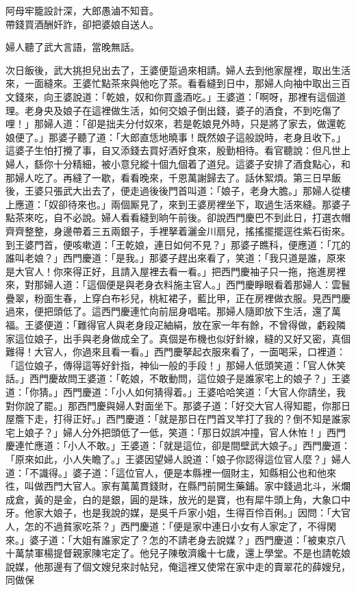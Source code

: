 \begin{myquote} 
阿母牢籠設計深，大郎愚滷不知音。\\帶錢買酒酬奸詐，卻把婆娘自送人。{}
\end{myquote} 

婦人聽了武大言語，當晚無話。

次日飯後，武大挑担兒出去了，王婆便踅過來相請。婦人去到他家屋裡，取出生活來，一面縫來。王婆忙點茶來與他吃了茶。看看縫到日中，那婦人向袖中取出三百文錢來，向王婆說道：「乾娘，奴和你買盞酒吃。」王婆道：「啊呀，那裡有這個道理。老身央及娘子在這裡做生活，如何交娘子倒出錢，婆子的酒食，不到吃傷了哩！」{}那婦人道：「卻是拙夫分付奴來，若是乾娘見外時，只是將了家去，做還乾娘便了。」那婆子聽了道：「大郎直恁地曉事！既然娘子這般說時，老身且收下。」這婆子生怕打攪了事，自又添錢去買好酒好食來，殷勤相待。看官聽說：但凡世上婦人，繇你十分精細，被小意兒縱十個九個着了道兒。這婆子安排了酒食點心，和那婦人吃了。再縫了一歇，看看晚來，千恩萬謝歸去了。話休絮煩。第三日早飯後，王婆只張武大出去了，便走過後後門首叫道：「娘子，老身大膽。」那婦人從樓上應道：「奴卻待來也。」兩個厮見了，來到王婆房裡坐下，取過生活來縫。那婆子點茶來吃，自不必說。婦人看看縫到晌午前後。卻說西門慶巴不到此日，{}打選衣帽齊齊整整，身邊帶着三五兩銀子，手裡拏着灑金川扇兒，搖搖擺擺逕徃紫石街來。到王婆門首，便咳嗽道：「王乾娘，連日如何不見？」那婆子瞧科，便應道：「兀的誰叫老娘？」西門慶道：「是我。」那婆子趕出來看了，笑道：「我只道是誰，原來是大官人！你來得正好，且請入屋裡去看一看。」把西門慶袖子只一拖，拖進房裡來，對那婦人道：「這個便是與老身衣料施主官人。」西門慶睜眼看着那婦人：雲鬟疊翠，粉面生春，上穿白布衫兒，桃紅裙子，藍比甲，正在房裡做衣服。見西門慶過來，便把頭低了。{}這西門慶連忙向前屈身唱喏。那婦人隨即放下生活，還了萬福。王婆便道：「難得官人與老身段疋紬絹，放在家一年有餘，不曾得做，虧殺隣家這位娘子，出手與老身做成全了。真個是布機也似好針線，縫的又好又密，真個難得！大官人，你過來且看一看。」西門慶拏起衣服來看了，一面喝采，口裡道：「這位娘子，傳得這等好針指，神仙一般的手段！」那婦人低頭笑道：「官人休笑話。」{}西門慶故問王婆道：「乾娘，不敢動問，這位娘子是誰家宅上的娘子？」王婆道：「你猜。」西門慶道：「小人如何猜得着。」王婆哈哈笑道：「大官人你請坐，我對你說了罷。」那西門慶與婦人對面坐下。那婆子道：「好交大官人得知罷，你那日屋簷下走，打得正好。」西門慶道：「就是那日在門首叉竿打了我的？倒不知是誰家宅上娘子？」婦人分外把頭低了一低，笑道：「那日奴誤冲撞，官人休恠！」{}西門慶連忙應道：「小人不敢。」王婆道：「就是這位，卻是間壁武大娘子。」西門慶道：「原來如此，小人失瞻了。」王婆因望婦人說道：「娘子你認得這位官人麼？」婦人道：「不識得。」婆子道：「這位官人，便是本縣裡一個財主，知縣相公也和他來徃，叫做西門大官人。家有萬萬貫錢財，在縣門前開生藥鋪。家中錢過北斗，米爛成倉，黃的是金，白的是銀，圓的是珠，放光的是寶，也有犀牛頭上角，大象口中牙。他家大娘子，也是我說的媒，是吳千戶家小姐，生得百伶百俐。」因問：「大官人，怎的不過貧家吃茶？」西門慶道：「便是家中連日小女有人家定了，不得閑來。」婆子道：「大姐有誰家定了？怎的不請老身去說媒？」西門慶道：「被東京八十萬禁軍楊提督親家陳宅定了。他兒子陳敬濟纔十七歲，還上學堂。不是也請乾娘說媒，他那邊有了個文嫂兒來討帖兒，俺這裡又使常在家中走的賣翠花的薛嫂兒，同做保